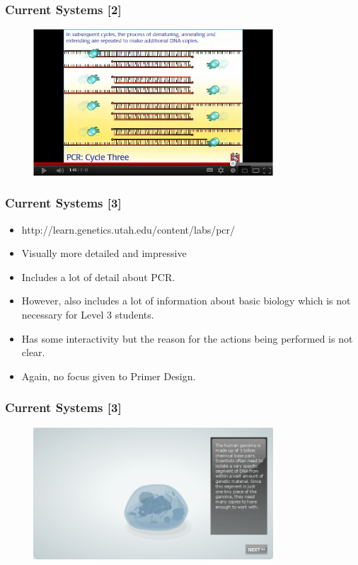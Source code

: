 \begin{frame}
\frametitle{Current Systems [2]}
\begin{figure}
  \begin{center}
    \includegraphics[width=0.8\textwidth]{./img/currentSystems2-4.png}
  \end{center}
\end{figure}
\end{frame}

\begin{frame}
\frametitle{Current Systems [3]}
\begin{itemize}
\item http://learn.genetics.utah.edu/content/labs/pcr/
\item Visually more detailed and impressive
\item Includes a lot of detail about PCR.
\item However, also includes a lot of information about basic biology
which is not necessary for Level 3 students.
\item Has some interactivity but the reason for the actions being
performed is not clear.
\item Again, no focus given to Primer Design.
\end{itemize}
\end{frame}

\begin{frame}
\frametitle{Current Systems [3]}
\begin{figure}
  \begin{center}
    \includegraphics[width=0.8\textwidth]{./img/currentSystems3-1.png}
  \end{center}
\end{figure}
\end{frame}

